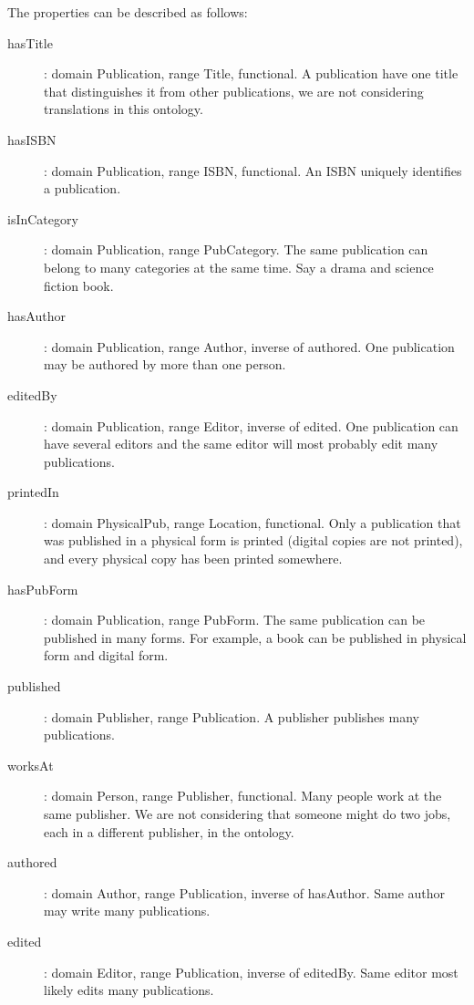 \documentclass[a4paper,12pt]{article}
\begin{document}
The properties can be described as follows:
\begin{description}
\item[hasTitle]: domain Publication, range Title, functional.  A publication
have one title that distinguishes it from other publications, we are not
considering translations in this ontology.

\item[hasISBN]: domain Publication, range ISBN, functional.  An ISBN uniquely
identifies a publication.

\item[isInCategory]: domain Publication, range PubCategory.  The same
publication can belong to many categories at the same time.  Say a drama and
science fiction book.

\item[hasAuthor]: domain Publication, range Author, inverse of authored.  One
publication may be authored by more than one person.

\item[editedBy]: domain Publication, range Editor, inverse of edited.  One
publication can have several editors and the same editor will most probably
edit many publications.

\item[printedIn]: domain PhysicalPub, range Location, functional.  Only a
publication that was published in a physical form is printed (digital copies
are not printed), and every physical copy has been printed somewhere.

\item[hasPubForm]: domain Publication, range PubForm.  The same publication can
be published in many forms.  For example, a book can be published in physical
form and digital form.

\item[published]: domain Publisher, range Publication.  A publisher publishes
many publications.

\item[worksAt]: domain Person, range Publisher, functional.  Many people work
at the same publisher.  We are not considering that someone might do two jobs,
each in a different publisher, in the ontology.

\item[authored]: domain Author, range Publication, inverse of hasAuthor.  Same
author may write many publications.

\item[edited]: domain Editor, range Publication, inverse of editedBy.  Same
editor most likely edits many publications.
\end{description}
\end{document}
